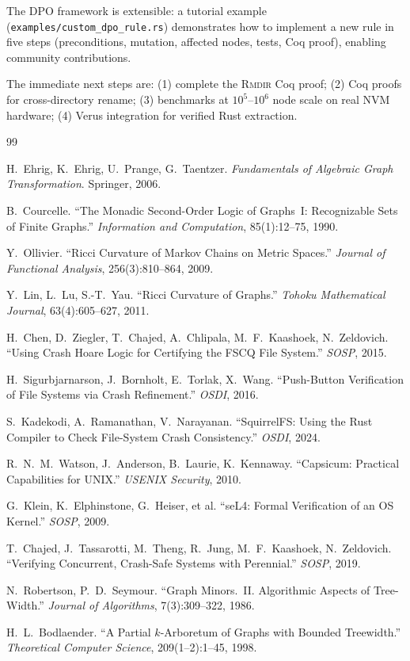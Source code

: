 \documentclass[11pt,a4paper]{article}
\theoremstyle{definition}
\begin{document}
The DPO framework is extensible: a tutorial example (\texttt{examples/custom\_dpo\_rule.rs})
demonstrates how to implement a new rule in five steps (preconditions, mutation,
affected nodes, tests, Coq proof), enabling community contributions.

The immediate next steps are: (1) complete the \textsc{Rmdir} Coq proof;
(2) Coq proofs for cross-directory rename;
(3) benchmarks at $10^5$--$10^6$ node scale on real NVM hardware;
(4) Verus integration for verified Rust extraction.


\begin{thebibliography}{99}

H.~Ehrig, K.~Ehrig, U.~Prange, G.~Taentzer.
\emph{Fundamentals of Algebraic Graph Transformation}.
Springer, 2006.

B.~Courcelle.
``The Monadic Second-Order Logic of Graphs~I: Recognizable Sets of Finite Graphs.''
\emph{Information and Computation}, 85(1):12--75, 1990.

Y.~Ollivier.
``Ricci Curvature of Markov Chains on Metric Spaces.''
\emph{Journal of Functional Analysis}, 256(3):810--864, 2009.

Y.~Lin, L.~Lu, S.-T.~Yau.
``Ricci Curvature of Graphs.''
\emph{Tohoku Mathematical Journal}, 63(4):605--627, 2011.

H.~Chen, D.~Ziegler, T.~Chajed, A.~Chlipala, M.~F.~Kaashoek, N.~Zeldovich.
``Using Crash Hoare Logic for Certifying the FSCQ File System.''
\emph{SOSP}, 2015.

H.~Sigurbjarnarson, J.~Bornholt, E.~Torlak, X.~Wang.
``Push-Button Verification of File Systems via Crash Refinement.''
\emph{OSDI}, 2016.

S.~Kadekodi, A.~Ramanathan, V.~Narayanan.
``SquirrelFS: Using the Rust Compiler to Check File-System Crash Consistency.''
\emph{OSDI}, 2024.

R.~N.~M.~Watson, J.~Anderson, B.~Laurie, K.~Kennaway.
``Capsicum: Practical Capabilities for UNIX.''
\emph{USENIX Security}, 2010.

G.~Klein, K.~Elphinstone, G.~Heiser, et al.
``seL4: Formal Verification of an OS Kernel.''
\emph{SOSP}, 2009.

T.~Chajed, J.~Tassarotti, M.~Theng, R.~Jung, M.~F.~Kaashoek, N.~Zeldovich.
``Verifying Concurrent, Crash-Safe Systems with Perennial.''
\emph{SOSP}, 2019.

N.~Robertson, P.~D.~Seymour.
``Graph Minors.~II. Algorithmic Aspects of Tree-Width.''
\emph{Journal of Algorithms}, 7(3):309--322, 1986.

H.~L.~Bodlaender.
``A Partial $k$-Arboretum of Graphs with Bounded Treewidth.''
\emph{Theoretical Computer Science}, 209(1--2):1--45, 1998.

\end{thebibliography}
\end{document}
